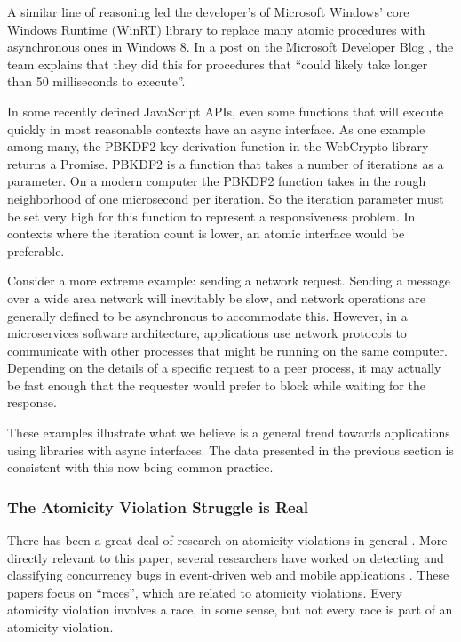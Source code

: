 \documentclass[acmsmall,anonymous,review]{acmart}\settopmatter{printfolios=true,printccs=false,printacmref=false}
\begin{document}
A similar line of reasoning led the developer's of Microsoft Windows' core Windows Runtime (WinRT) library to replace many atomic procedures with asynchronous ones in Windows 8.
In a post on the Microsoft Developer Blog \cite{Windows8Team2012}, the team explains that they did this for procedures that ``could likely take longer than 50 milliseconds to execute''.

In some recently defined JavaScript APIs, even some functions that will execute quickly in most reasonable contexts have an async interface.
As one example among many, the PBKDF2 key derivation function in the WebCrypto library returns a Promise.
PBKDF2 is a function that takes a number of iterations as a parameter.
On a modern computer the PBKDF2 function takes in the rough neighborhood of one microsecond per iteration.
So the iteration parameter must be set very high for this function to represent a responsiveness problem.
In contexts where the iteration count is lower, an atomic interface would be preferable.

Consider a more extreme example: sending a network request.
Sending a message over a wide area network will inevitably be slow, and network operations are generally defined to be asynchronous to accommodate this.
However, in a microservices software architecture, applications use network protocols to communicate with other processes that might be running on the same computer.
Depending on the details of a specific request to a peer process, it may actually be fast enough that the requester would prefer to block while waiting for the response.

These examples illustrate what we believe is a general trend towards applications using libraries with async interfaces.
The data presented in the previous section is consistent with this now being common practice.


\subsubsection{The Atomicity Violation Struggle is Real}

There has been a great deal of research on atomicity violations in general \cite{Lu2008}.
More directly relevant to this paper, several researchers have worked on detecting and classifying concurrency bugs in event-driven web and mobile applications \cite{Petrov2012, Hsiao2014, Mutlu2015, Zhang2017}.
These papers focus on ``races'', which are related to atomicity violations.
Every atomicity violation involves a race, in some sense, but not every race is part of an atomicity violation.
\end{document}
